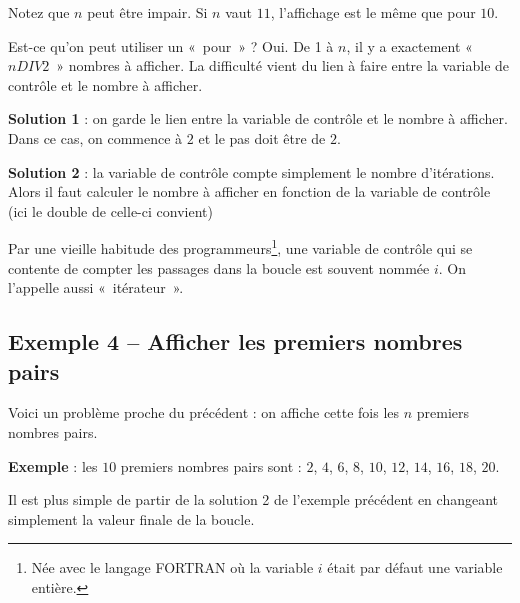 		Notez que $n$ peut être impair. Si $n$ vaut $11$, 
		l'affichage est le même que pour $10$.

		Est-ce qu'on peut utiliser un «~pour~» ? 
		Oui. De 1 à $n$, il y a exactement «~$n DIV 2$~» nombres à afficher. 
		La difficulté vient du lien à faire entre la variable de
		contrôle et le nombre à afficher.

		\textbf{Solution 1} : 
		on garde le lien entre la variable de contrôle 
		et le nombre à afficher. 
		Dans ce cas, on commence à $2$ et le pas doit être de $2$.


		\textbf{Solution 2} : 
		la variable de contrôle compte simplement le nombre d'itérations.
		Alors il faut calculer le nombre à afficher en fonction de la variable
		de contrôle (ici le double de celle-ci convient)


		Par une vieille habitude des programmeurs\footnote{Née avec 
		le langage FORTRAN où la variable $i$ était par défaut une variable entière.},
		une variable de contrôle qui se contente de compter les passages dans
		la boucle est souvent nommée $i$. 
		On l'appelle aussi «~itérateur~».

	\subsection{Exemple 4 -- Afficher les premiers nombres pairs}

		Voici un problème proche du précédent : 
		on affiche cette fois les $n$ premiers nombres pairs.
		
		\textbf{Exemple} : 
		les $10$ premiers nombres pairs sont : $2$, $4$, $6$, $8$, $10$, $12$, $14$, $16$, $18$, $20$.
		
		Il est plus simple de partir de la solution 2 de l'exemple précédent
		en changeant simplement la valeur finale de la boucle.

